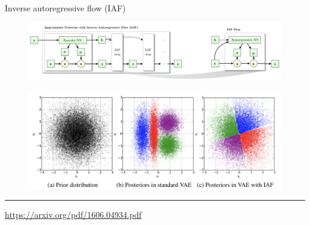 \documentclass{beamer}
\begin{document}
\begin{frame}{Inverse autoregressive flow (IAF)}
	\begin{figure}
		\includegraphics[width=\linewidth]{figs/iaf2.png}
	\end{figure}
	\begin{figure}
		\includegraphics[width=\linewidth]{figs/iaf1.png}
	\end{figure}
	\vfill
	\hrule\medskip
	{\scriptsize \href{https://arxiv.org/pdf/1606.04934.pdf}{https://arxiv.org/pdf/1606.04934.pdf}} 
\end{frame}
\end{document}
